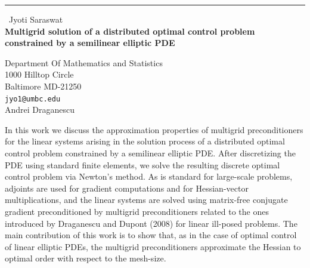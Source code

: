 \documentclass{report}
\begin{document}
\begin{center}
\rule{6in}{1pt} \
{\large Jyoti Saraswat \\
{\bf Multigrid solution of a distributed optimal control problem constrained by a semilinear elliptic PDE}}

Department Of Mathematics and Statistics \\ 1000 Hilltop Circle \\ Baltimore MD-21250
\\
{\tt jyo1@umbc.edu}\\
Andrei Draganescu\end{center}

In this work we discuss the approximation properties of multigrid
preconditioners for the linear systems arising in the solution process of
a distributed optimal control problem constrained by a semilinear
elliptic PDE. After discretizing the PDE using standard finite elements,
we solve the resulting discrete optimal control problem via Newton's
method. As is standard for large-scale problems, adjoints are used for
gradient computations and for Hessian-vector multiplications, and the
linear systems are solved using matrix-free conjugate gradient
preconditioned by multigrid preconditioners related to the ones
introduced by Draganescu and Dupont (2008) for linear ill-posed problems.
The main contribution of this work is to show that, as in the case of
optimal control of linear elliptic PDEs, the multigrid preconditioners
approximate the Hessian to optimal order with respect to the mesh-size.
\end{document}
